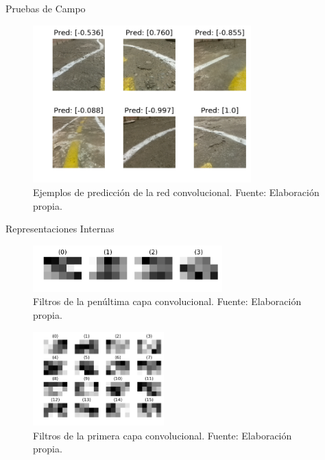 \documentclass[10pt]{beamer}
\begin{document}
\begin{frame}{Pruebas de Campo}
    \begin{figure}[!h] 
        \centering
        \includegraphics[width=0.75\textwidth]{../img/testimg}
        \caption[Ejemplos de predicción de la red convolucional]{Ejemplos de predicción de la red convolucional. Fuente: Elaboración propia. }
        \label{fig:testimg}
    \end{figure}
\end{frame}

\begin{frame}{Representaciones Internas}
    \begin{figure}[!h] 
        \centering
        \includegraphics[width=0.65\textwidth]{../img/filtros7}
        \caption[Filtros de la penúltima capa convolucional]{Filtros de la penúltima capa convolucional. Fuente: Elaboración propia. }
        \label{fig:filtros7}
    \end{figure}
    \begin{figure}[!h] 
        \centering
        \includegraphics[width=0.45\textwidth]{../img/filtros1}
        \caption[Filtros de la primera capa convolucional]{Filtros de la primera capa convolucional. Fuente: Elaboración propia. }
        \label{fig:filtros1}
    \end{figure}
\end{frame}
\end{document}
